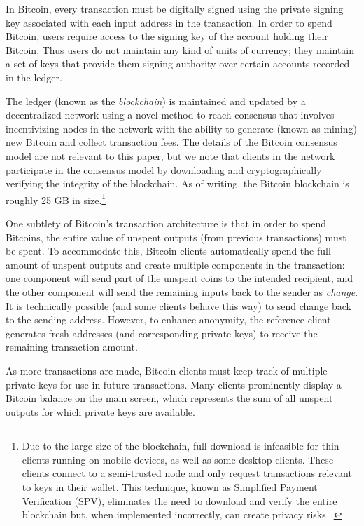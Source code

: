 In Bitcoin, every transaction must be digitally signed using the private signing key associated with each input address in the transaction. In order to spend Bitcoin, users require access to the signing key of the account holding their Bitcoin. Thus users do not maintain any kind of units of currency; they maintain a set of keys that provide them signing authority over certain accounts recorded in the ledger. 

The ledger (known as the \emph{blockchain}) is maintained and updated by a decentralized network using a novel method to reach consensus that involves incentivizing nodes in the network with the ability to generate (known as mining) new Bitcoin and collect transaction fees. The details of the Bitcoin consensus model are not relevant to this paper, but we note that clients in the network participate in the consensus model by downloading and cryptographically verifying the integrity of the blockchain. As of writing, the Bitcoin blockchain is roughly 25 GB in size.\footnote{Due to the large size of the blockchain, full download is infeasible for thin clients running on mobile devices, as well as some desktop clients. These clients connect to a semi-trusted node and only request transactions relevant to keys in their wallet. This technique, known as Simplified Payment Verification (SPV), eliminates the need to download and verify the entire blockchain but, when implemented incorrectly, can create privacy risks~\cite{SPVbugs}.}

One subtlety of Bitcoin's transaction architecture is that in order to spend Bitcoins, the entire value of unspent outputs (\ie from previous transactions) must be spent. To accommodate this, Bitcoin clients automatically spend the full amount of unspent outputs and create multiple components in the transaction: one component will send part of the unspent coins to the intended recipient, and the other component will send the remaining inputs back to the sender as \emph{change}. It is technically possible (and some clients behave this way) to send change back to the sending address. However, to enhance anonymity, the reference client generates fresh addresses (and corresponding private keys) to receive the remaining transaction amount. 

As more transactions are made, Bitcoin clients must keep track of multiple private keys for use in future transactions. Many clients prominently display a Bitcoin balance on the main screen, which represents the sum of all unspent outputs for which private keys are available. 

